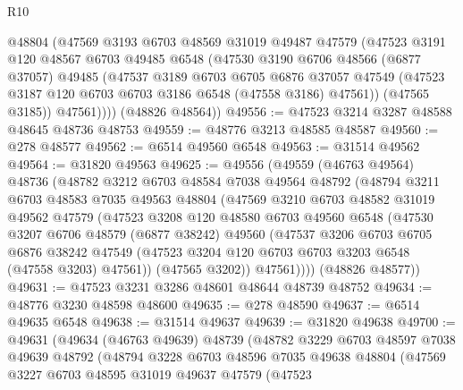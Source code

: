 \begin{lexlean}{R10}
\begin{coremodule}
          @48804
          (@47569
            @3193
            @6703
            @48569
            @31019
            @49487
            @47579
            (@47523
              @3191
              @120
              @48567
              @6703
              @49485
              @6548
              (@47530
                @3190
                @6706
                @48566
                (@6877 @37057)
                @49485
                (@47537
                  @3189
                  @6703
                  @6705
                  @6876
                  @37057
                  @47549
                  (@47523 @3187 @120 @6703 @6703 @3186 @6548 (@47558 @3186) @47561))
                (@47565 @3185))
              @47561))))
      (@48826 @48564))
@49556 := @47523 @3214 @3287 @48588 @48645 @48736 @48753
@49559 := @48776 @3213 @48585 @48587
@49560 := @278 @48577
@49562 := @6514 @49560 @6548
@49563 := @31514 @49562
@49564 := @31820 @49563
@49625 := @49556
    (@49559
      (@46763 @49564)
      @48736
      (@48782
        @3212
        @6703
        @48584
        @7038
        @49564
        @48792
        (@48794
          @3211
          @6703
          @48583
          @7035
          @49563
          @48804
          (@47569
            @3210
            @6703
            @48582
            @31019
            @49562
            @47579
            (@47523
              @3208
              @120
              @48580
              @6703
              @49560
              @6548
              (@47530
                @3207
                @6706
                @48579
                (@6877 @38242)
                @49560
                (@47537
                  @3206
                  @6703
                  @6705
                  @6876
                  @38242
                  @47549
                  (@47523 @3204 @120 @6703 @6703 @3203 @6548 (@47558 @3203) @47561))
                (@47565 @3202))
              @47561))))
      (@48826 @48577))
@49631 := @47523 @3231 @3286 @48601 @48644 @48739 @48752
@49634 := @48776 @3230 @48598 @48600
@49635 := @278 @48590
@49637 := @6514 @49635 @6548
@49638 := @31514 @49637
@49639 := @31820 @49638
@49700 := @49631
    (@49634
      (@46763 @49639)
      @48739
      (@48782
        @3229
        @6703
        @48597
        @7038
        @49639
        @48792
        (@48794
          @3228
          @6703
          @48596
          @7035
          @49638
          @48804
          (@47569
            @3227
            @6703
            @48595
            @31019
            @49637
            @47579
            (@47523

\end{coremodule}
\end{lexlean}
